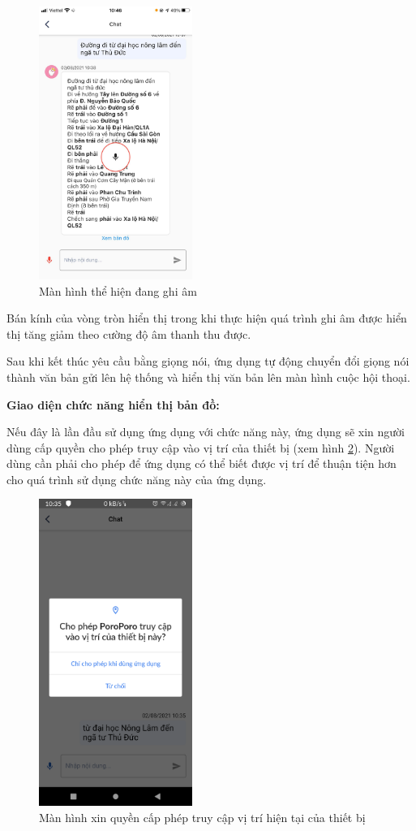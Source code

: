 \begin{figure}[H]
    \centering
    \includegraphics[width=5cm]{images/Screen-record.png}
    \caption{Màn hình thể hiện đang ghi âm}
    \label{fig:screen-record}
\end{figure}

Bán kính của vòng tròn hiển thị trong khi thực hiện quá trình ghi âm được hiển thị tăng giảm theo cường độ âm thanh thu được.

Sau khi kết thúc yêu cầu bằng giọng nói, ứng dụng tự động chuyển đổi giọng nói thành văn bản gửi lên hệ thống và hiển thị văn bản lên màn hình cuộc hội thoại.


\textbf{Giao diện chức năng hiển thị bản đồ:}

Nếu đây là lần đầu sử dụng ứng dụng với chức năng này, ứng dụng sẽ xin người dùng cấp quyền cho phép truy cập vào vị trí của thiết bị (xem hình \ref{fig: accesss-location}). Người dùng cần phải cho phép để ứng dụng có thể biết được vị trí để thuận tiện hơn cho quá trình sử dụng chức năng này của ứng dụng.

\begin{figure}[H]
    \centering
    \includegraphics[width=5cm]{images/access_location.jpg}
    \caption{Màn hình xin quyền cấp phép truy cập vị trí hiện tại của thiết bị}
    \label{fig: accesss-location}
\end{figure}

